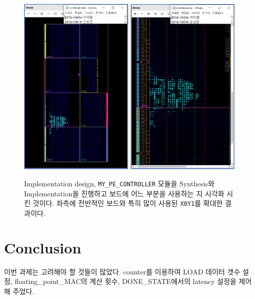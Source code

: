 \documentclass{article}
\begin{document}
\begin{figure}[htb!]
	\centering
	\includegraphics[width=0.49\textwidth]{fig/My_PE_Controller_Design1.png}
	\includegraphics[width=0.49\textwidth]{fig/My_PE_Controller_Design2.png}
\caption{Implementation design, \texttt{MY\_PE\_CONTROLLER} 모듈을 Synthesis와 Implementation을 진행하고 보드에 어느 부분을 사용하는 지 시각화 시킨 것이다. 좌측에 전반적인 보드와 특히 많이 사용된 \texttt{X0Y1}를 확대한 결과이다.}
\label{fig4}
\end{figure}

\newpage
\section{Conclusion}
이번 과제는 고려해야 할 것들이 많았다. counter를 이용하여 LOAD 데이터 갯수 설정, floating\_point\_MAC의 계산 횟수, DONE\_STATE에서의 latency 설정을 제어해 주었다.\\
\end{document}
